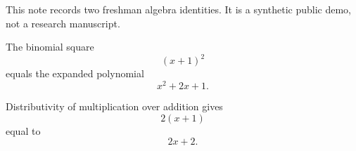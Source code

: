\documentclass{article}
\begin{document}
This note records two freshman algebra identities. It is a synthetic
public demo, not a research manuscript.

The binomial square
\begin{equation}
\label{eq:binomial-left}
(x+1)^{2}
\end{equation}
equals the expanded polynomial
\begin{equation}
\label{eq:binomial-right}
x^{2} + 2x + 1.
\end{equation}

Distributivity of multiplication over addition gives
\begin{equation}
\label{eq:twice-left}
2(x+1)
\end{equation}
equal to
\begin{equation}
\label{eq:twice-right}
2x + 2.
\end{equation}
\end{document}
